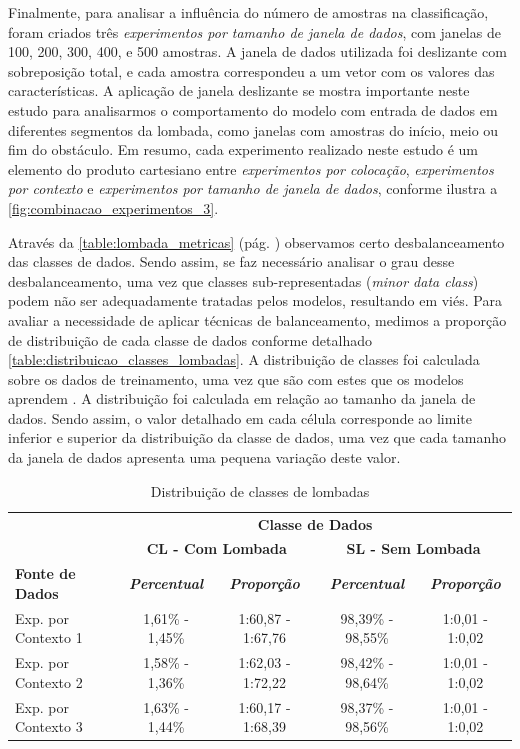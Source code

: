Finalmente, para analisar a influência do número de amostras na classificação, foram criados três \emph{experimentos por tamanho de janela de dados}, com janelas de 100, 200, 300, 400, e 500 amostras. A janela de dados utilizada foi deslizante com sobreposição total, e cada amostra correspondeu a um vetor com os valores das características. A aplicação de janela deslizante se mostra importante neste estudo para analisarmos o comportamento do modelo com entrada de dados em diferentes segmentos da lombada, como janelas com amostras do início, meio ou fim do obstáculo. Em resumo, cada experimento realizado neste estudo é um elemento do produto cartesiano entre \emph{experimentos por colocação}, \emph{experimentos por contexto} e \emph{experimentos por tamanho de janela de dados}, conforme ilustra a \autoref{fig:combinacao_experimentos_3}.

Através da \autoref{table:lombada_metricas} (pág. \pageref{table:lombada_metricas}) observamos certo desbalanceamento das classes de dados. Sendo assim, se faz necessário analisar o grau desse desbalanceamento, uma vez que classes sub-representadas (\textit{minor data class}) podem não ser adequadamente tratadas pelos modelos, resultando em viés. Para avaliar a necessidade de aplicar técnicas de balanceamento, medimos a proporção de distribuição de cada classe de dados conforme detalhado \autoref{table:distribuicao_classes_lombadas}. A distribuição de classes foi calculada sobre os dados de treinamento, uma vez que são com estes que os modelos aprendem \cite{He2013, Kuhn2013}. A distribuição foi calculada em relação ao tamanho da janela de dados. Sendo assim, o valor detalhado em cada célula corresponde ao limite inferior e superior da distribuição da classe de dados, uma vez que cada tamanho da janela de dados apresenta uma pequena variação deste valor.

\begin{table}[h]
\caption{Distribuição de classes de lombadas}
\label{table:distribuicao_classes_lombadas}
\centering
\scriptsize
\begin{tabular}{lcccc}
\cmidrule(l){2-5}
\multicolumn{1}{c}{\multirow{2}{*}{\textbf{}}} & 
\multicolumn{4}{c}{\textbf{Classe de Dados}} \\ \cmidrule(l){2-5} 
\multicolumn{1}{c}{} & 
\multicolumn{2}{c}{\textbf{CL - Com Lombada}} & 
\multicolumn{2}{c}{\textbf{SL - Sem Lombada}} \\ \midrule
\textbf{Fonte de Dados} & 
\textit{\textbf{Percentual}} & 
\textit{\textbf{Proporção}} & 
\textit{\textbf{Percentual}} & 
\textit{\textbf{Proporção}} \\ \midrule
Exp. por Contexto 1 & 1,61\% - 1,45\% & 1:60,87 - 1:67,76 & 98,39\% - 98,55\% & 1:0,01 - 1:0,02 \\ \midrule
Exp. por Contexto 2 & 1,58\% - 1,36\% & 1:62,03 - 1:72,22 & 98,42\% - 98,64\% & 1:0,01 - 1:0,02 \\ \midrule
Exp. por Contexto 3 & 1,63\% - 1,44\% & 1:60,17 - 1:68,39 & 98,37\% - 98,56\% & 1:0,01 - 1:0,02 \\ \bottomrule
\end{tabular}
\end{table}

